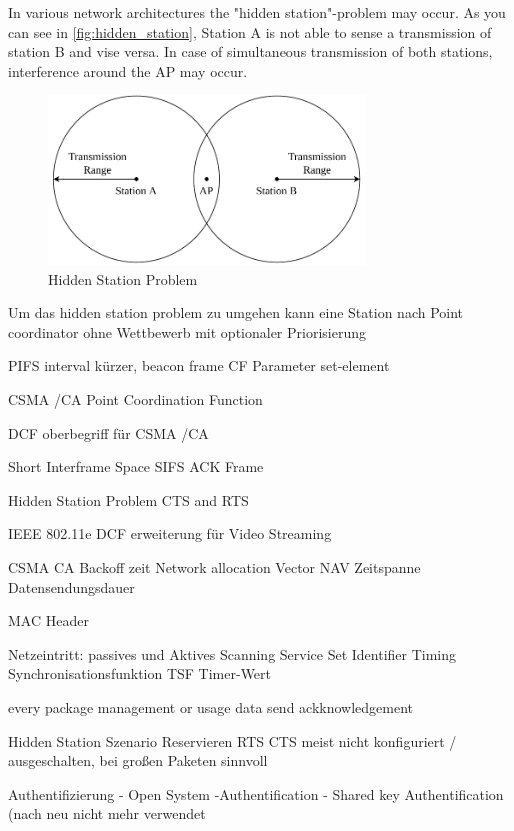 \documentclass[]{nsm-thesis}
\begin{document}
In various network architectures the "hidden station"-problem may occur. As you can see in \autoref{fig:hidden_station}, Station A is not able to sense a transmission of station B and vise versa. In case of simultaneous transmission of both stations, interference around the \ac{AP} may occur. 
\begin{figure}%
	\centering
	\includegraphics[width=0.75\textwidth]{figures/hidden_station.pdf}
	\caption{Hidden Station Problem}%
	\label{fig:hidden_station}%
\end{figure}
Um das hidden station problem zu umgehen kann eine Station nach \textcite{sauter_wireless_2022} 
Point coordinator 
ohne Wettbewerb mit optionaler Priorisierung

PIFS interval kürzer, 
beacon frame
CF Parameter set-element

CSMA /CA
Point Coordination Function

\textcite{sauter_wireless_2022}
DCF oberbegriff für CSMA /CA
 
 
Short Interframe Space SIFS ACK Frame 
 
Hidden Station Problem 
CTS and RTS
 
IEEE 802.11e DCF erweiterung für Video Streaming

CSMA CA Backoff zeit
Network allocation Vector NAV Zeitspanne Datensendungsdauer

MAC Header

Netzeintritt:
passives und Aktives Scanning
Service Set Identifier
Timing Synchronisationsfunktion TSF Timer-Wert

\textcite{sauter_wireless_2022}
every package management or usage data send ackknowledgement

Hidden Station Szenario
Reservieren
RTS CTS
meist nicht konfiguriert / ausgeschalten, bei großen Paketen sinnvoll



Authentifizierung
- Open System -Authentification
- Shared key Authentification
(nach neu nicht mehr verwendet
\end{document}
